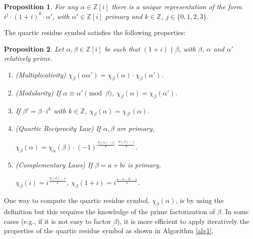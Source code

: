 \documentclass[11pt, a4paper, twoside, openright]{report}
\newtheorem{proposition}{Proposition}
\begin{document}
 			
 			\begin{proposition}
 				For any $\alpha \in \mathbb{Z}[i]$ there is a unique representation of the form 
 				$i^j \cdot (1+i)^k \cdot \alpha'$, with $\alpha' \in \mathbb{Z}[i]$ primary and $k \in \mathbb{Z}$, $j \in \{ 0,1,2,3\}$.
 			\end{proposition}
 			
 			The quartic residue symbol satisfies the following properties: 
 			
 			\begin{proposition}
 				Let $\alpha,\beta \in \mathbb{Z}[{i}]$ be such that $(1+i) \nmid \beta$, with $\beta$, $\alpha$ and $\alpha'$ relatively prime.
 				\begin{enumerate}
 					
 					\item (Multiplicativity) $\chi_{\beta}(\alpha \alpha') = \chi_{\beta}(\alpha) \cdot \chi_{\beta}(\alpha')$.
 					\item (Modularity) If $\alpha \equiv \alpha' \pmod{\beta}$, $\chi_{\beta}(\alpha) = \chi_{\beta}(\alpha')$.
 					\item If $\beta' = \beta \cdot i^k$ with $k \in \mathbb{Z}$, $\chi_{\beta}(\alpha)= \chi_{\beta'}(\alpha)$.
 					\item (Quartic Reciprocity Law) If $\alpha, \beta$ are primary, 
 						
 						\hspace{30mm} $\chi_{\beta}(\alpha) = \chi_{\alpha}(\beta) \cdot (-1)^{\frac{N(\alpha)-1}{4} \cdot \frac{N(\beta)-1}{4}}$.
 					\item (Complementary Laws) If $\beta = a + bi$ is primary,
 					
 						\hspace{30mm} $\chi_{\beta}(i)= i^{\frac{N(\beta)-1}{2}}$,  $\chi_{\beta}(1+i) = i^{\frac{a-b-b^2-1}{4}}$.
 						
 				\end{enumerate}
 				
 			\end{proposition}
 			
 			
 				One way to compute the quartic residue symbol, $\chi_{\beta}(\alpha)$, is by using the definition but this  requires the
 			 			knowledge of the prime factorization of $\beta$. In some cases (e.g., if it is not easy to  factor $\beta$), it is more efficient   to apply iteratively the properties of the quartic residue symbol as shown in Algorithm \ref{alg1}. 
 			
\end{document}
